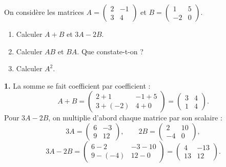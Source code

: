 \documentclass[11pt]{article}
\begin{document}
\begin{exoresolu}
On considère les matrices $A=\begin{pmatrix} 2 & -1 \\ 3 & 4 \end{pmatrix}$ et $B=\begin{pmatrix} 1 & 5 \\ -2 & 0 \end{pmatrix}$.
\begin{enumerate}
\item Calculer $A+B$ et $3A-2B$.
\item Calculer $AB$ et $BA$. Que constate-t-on ?
\item Calculer $A^2$.
\end{enumerate}
\tcblower
\textbf{1.} La somme se fait coefficient par coefficient :
\[ A+B=\begin{pmatrix} 2+1 & -1+5 \\ 3+(-2) & 4+0 \end{pmatrix}=\begin{pmatrix} 3 & 4 \\ 1 & 4 \end{pmatrix}. \]
Pour $3A-2B$, on multiplie d'abord chaque matrice par son scalaire :
\[ 3A=\begin{pmatrix} 6 & -3 \\ 9 & 12 \end{pmatrix}, \qquad 2B=\begin{pmatrix} 2 & 10 \\ -4 & 0 \end{pmatrix}, \]
\[ 3A-2B=\begin{pmatrix} 6-2 & -3-10 \\ 9-(-4) & 12-0 \end{pmatrix}=\begin{pmatrix} 4 & -13 \\ 13 & 12 \end{pmatrix}. \]


\end{exoresolu}
\end{document}
